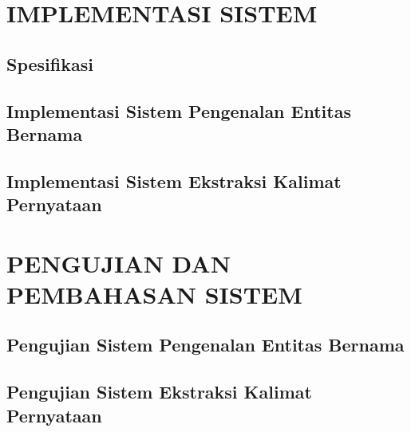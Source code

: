\documentclass[ugmskripsi]{ugmskripsi}
\begin{document}
\chapter{IMPLEMENTASI SISTEM}
\label{IMPLEMENTASI SISTEM}

	\section{Spesifikasi}
	\label{implementasi spesifikasi}
	

	\section{Implementasi Sistem Pengenalan Entitas Bernama}
	\label{implementasi sistem ner}
	

	\section{Implementasi Sistem Ekstraksi Kalimat Pernyataan}
	\label{implementasi sistem ekstraksi kalimat pernyataan}
	




\chapter{PENGUJIAN DAN PEMBAHASAN SISTEM}
\label{PENGUJIAN DAN PEMBAHASAN SISTEM}


	\section{Pengujian Sistem Pengenalan Entitas Bernama}
	\label{pengujian sistem ner}
	

	\section{Pengujian Sistem Ekstraksi Kalimat Pernyataan}
	\label{pengujian sistem ekstraksi kalimat pernyataan}
	
\end{document}

